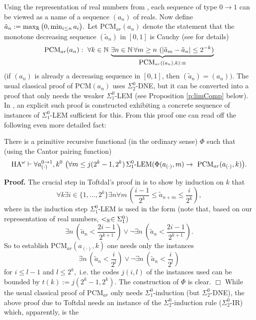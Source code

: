 Using the representation of real numbers from 
\cite{Kohlenbach08}, each sequence of type $0\to 1$ can be viewed 
as a name of a sequence $(a_n)$ of reals. Now define 
$\tilde{a}_n:=\max_{\mathbb{R}}\big(0,\min\nolimits_{i\le n}a_i\big).$ 
Let PCM$_{ar}(a_n)$ denote the statement that the monotone decreasing 
sequence $(\tilde{a}_n)$ in $[0,1]$ is Cauchy (see \cite{Kohlenbach08} 
for details) 
\[\mbox{PCM}_{ar}(a_n): \ \forall k\in\NN\,\underbrace{\exists n\in\NN\, 
\forall m\ge n\ (|\tilde{a}_m- \tilde{a}_n|\le 
2^{-k})}_{\mbox{PCM}_{ar}((a_n),k)
:\equiv} \]
(if $(a_n)$ is already 
a decreasing sequence in $[0,1]$, then $(\tilde{a}_n)=(a_n)).$ 
The usual classical proof of PCM$(a_n)$ uses $\Sigma^0_2$-DNE, but it can be 
converted into a proof that only needs the weaker $\Sigma^0_1$-LEM (see 
Proposition \ref{p:limComp} below). 
In \cite{Toftdal}, an explicit such proof is constructed 
exhibiting a concrete sequence of instances of $\Sigma^0_1$-LEM sufficient 
for this. From this proof one can read off the following even more detailed 
fact:
\begin{prop} There is a primitive recursive functional (in the 
ordinary sense) $\Phi$ such that (using the Cantor pairing function)
\[ \mbox{\rm HA}^{\omega}\vdash \forall a^{0\to 1}_{(\cdot)}, k^0\ 
\big( \forall m \le j(2^k-1,2^k) \,\Sigma^0_1\mbox{\rm -LEM}(\Phi(a_{(\cdot)},m)
\rightarrow 
\ \mbox{\rm PCM}_{ar}(a_{(\cdot)},k)\big). \] 
\end{prop} 
{\bf Proof.} The crucial step in Toftdal's proof in \cite{Toftdal} is 
to show by induction on $k$ that 
\[ \forall k\exists i\in \{ 1,\ldots,2^k\} \exists n \forall m \, 
\left( \frac{i-1}{2^k}\le \tilde{a}_{n+m}\le \frac{i}{2^k}\right), \]
where in the induction step $\Sigma^0_1$-LEM is used in the form 
(note that, based on our representation of real numbers, $<_{\mathbb{R}}\in\Sigma^0_1$) 
\[\exists n\ \left( \tilde{a}_n <\frac{2i-1}{2^{k+1}}\right) \vee 
\neg \exists n\ \left( \tilde{a}_n <\frac{2i-1}{2^{k+1}}\right). \]
So to establish PCM$_{ar}(a_{(\cdot)},k)$ one needs only the instances 
\[\exists n\ \left( \tilde{a}_n <\frac{i}{2^{l}}\right) \vee 
\neg \exists n\ \left( \tilde{a}_n <\frac{i}{2^{l}}\right) \] 
for $i\le l-1$ and $l\le 2^k,$ i.e. the codes $j(i,l)$ of the instances 
used can be bounded by $t(k):=j(2^k-1,2^k).$  The construction of $\Phi$ is 
clear. 
 \hfill $\Box$ 
While the usual classical proof of PCM$_{ar}$ only needs $\Sigma^0_1$-induction 
(but $\Sigma^0_2$-DNE), the above proof due to Toftdal needs an instance of 
the $\Sigma^0_2$-induction rule ($\Sigma^0_2$-IR) which, apparently, is the 
